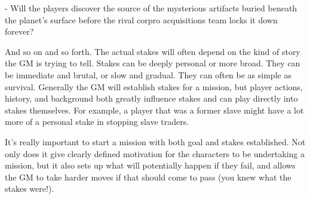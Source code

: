      -   Will the players discover the source of the mysterious artifacts buried beneath the
         planet’s surface before the rival corpro acquisitions team locks it down forever?


And so on and so forth. The actual stakes will often depend on the kind of story the GM is trying
to tell. Stakes can be deeply personal or more broad. They can be immediate and brutal, or slow
and gradual. They can often be as simple as survival. Generally the GM will establish stakes for a
mission, but player actions, history, and background both greatly influence stakes and can play
directly into stakes themselves. For example, a player that was a former slave might have a lot
more of a personal stake in stopping slave traders.


It’s really important to start a mission with both goal and stakes established. Not only does it
give clearly defined motivation for the characters to be undertaking a mission, but it also sets up
what will potentially happen if they fail, and allows the GM to take harder moves if that should
come to pass (you knew what the stakes were!).